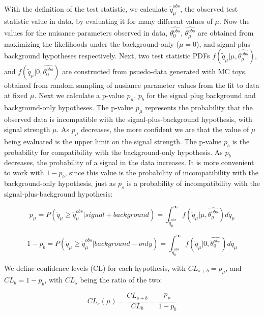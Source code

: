 With the definition of the test statistic, we calculate $\tilde{q}_{\mu}^{obs}$, the observed test statistic value in data, by evaluating it for many different
values of $\mu$. Now the values for the nuisance parameters observed in data, $\hat{\theta_{0}^{obs}}$, $\hat{\theta_{\mu}^{obs}}$ are obtained from maximizing
the likelihoods under the background-only ($\mu=0$), and signal-plus-background hypotheses respectively. Next, two test statistic PDFs
$f(\tilde{q}_{\mu}|\mu,\hat{\theta_{\mu}^{obs}})$, and $f(\tilde{q}_{\mu}|0,\hat{\theta_{0}^{obs}})$ are constructed from psuedo-data
generated with MC toys, obtained from random sampling of nusiance parameter values from the fit to data at fixed $\mu$.  Next we calculate a p-value $p_{\mu}$, $p_{b}$
for the signal plug background and background-only hypotheses. The p-value $p_{\mu}$ represents the probability that the observed data is incompatible with the
signal-plus-background hypothesis, with signal strength $\mu$. As $p_{\mu}$ decreases, the more confident we are that the value of $\mu$ being evaluated is the
upper limit on the signal strength. The p-value $p_{b}$ is the probability for compatibility with the background-only hypothesis. As $p_{b}$ decreases, the probability
of a signal in the data increases. It is more convenient to work with $1-p_{b}$, since this value is the probability of incompatibility with the background-only hypothesis,
just as $p_{s}$ is a probability of incompatibility with the signal-plus-background hypothesis:

\begin{equation}
\label{eqn:pvalues1}
p_{\mu} = P(\tilde{q}_{\mu} \geq \tilde{q}_{\mu}^{obs}|signal+background) = \int_{\tilde{q}_{\mu}^{obs}}^{\infty} f(\tilde{q}_{\mu}|\mu,\hat{\theta_{\mu}^{obs}}) d\tilde{q}_{\mu}
\end{equation}

\begin{equation}
\label{eqn:pvalues2}
1- p_{b} = P(\tilde{q}_{\mu} \geq \tilde{q}_{\mu}^{obs}|background-only) = \int_{\tilde{q}_{0}^{obs}}^{\infty} f(\tilde{q}_{\mu}|0,\hat{\theta_{0}^{obs}}) d\tilde{q}_{\mu}
\end{equation}

\noindent We define confidence levels (CL) for each hypothesis, with $CL_{s+b} = p_{\mu}$, and $CL_{b} = 1-p_{b}$, with $CL_{s}$ being the ratio of the two:

\begin{equation}
\label{eqn:cls}
CL_{s}(\mu) = \frac{CL_{s+b}}{CL_{b}} = \frac{p_{\mu}}{1-p_{b}}
\end{equation}

